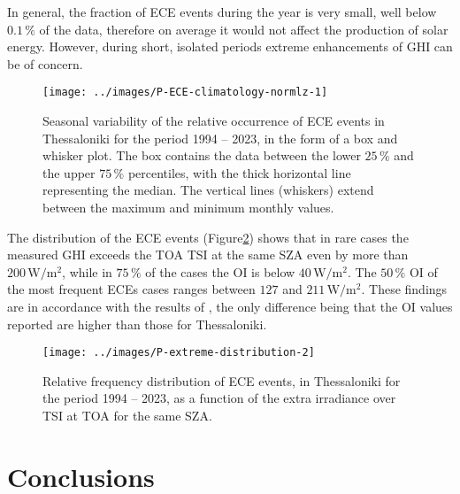 \documentclass[preprint, 5p,
authoryear]{elsarticle} %
\begin{document}
In general, the fraction of ECE events during the year is very small,
well below \(0.1\,\%\) of the data, therefore on average it would not
affect the production of solar energy. However, during short, isolated
periods extreme enhancements of GHI can be of concern.

\begin{figure}

{\centering \texttt{[image: ../images/P-ECE-climatology-normlz-1]} 

}

\caption{Seasonal variability of the relative occurrence of ECE events in Thessaloniki for the period 1994 -- 2023, in the form of a box and whisker plot. The box contains the data between the lower $25\,\%$ and the upper $75\,\%$ percentiles, with the thick horizontal line representing the median. The vertical lines (whiskers) extend between the maximum and minimum monthly values.}\label{fig:relative-month-occurancies-ECE}
\end{figure}

The distribution of the ECE events
(Figure\nobreakspace{}\ref{fig:P-extreme-distribution}) shows that in
rare cases the measured GHI exceeds the TOA TSI at the same SZA even by
more than \(200\,\text{W}/\text{m}^2\), while in \(75\,\%\) of the cases
the OI is below \(40\,\text{W}/\text{m}^2\). The \(50\,\%\) OI of the
most frequent ECEs cases ranges between \(127\) and
\(211\,\text{W}/\text{m}^2\). These findings are in accordance with the
results of \citet{Vamvakas2020}, the only difference being that the OI
values reported are higher than those for Thessaloniki.

\begin{figure}

{\centering \texttt{[image: ../images/P-extreme-distribution-2]} 

}

\caption{Relative frequency distribution of ECE events, in Thessaloniki for the period 1994 -- 2023, as a function of the extra irradiance over TSI at TOA for the same SZA.}\label{fig:P-extreme-distribution}
\end{figure}

\hypertarget{conclusions}{%
\section{Conclusions}\label{conclusions}}
\end{document}
